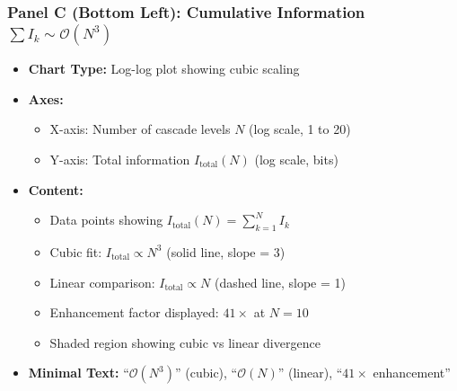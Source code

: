 \subsubsection*{Panel C (Bottom Left): Cumulative Information $\sum I_k \sim \mathcal{O}(N^3)$}
\begin{itemize}
\item \textbf{Chart Type:} Log-log plot showing cubic scaling
\item \textbf{Axes:}
  \begin{itemize}
  \item X-axis: Number of cascade levels $N$ (log scale, 1 to 20)
  \item Y-axis: Total information $I_{\text{total}}(N)$ (log scale, bits)
  \end{itemize}
\item \textbf{Content:}
  \begin{itemize}
  \item Data points showing $I_{\text{total}}(N) = \sum_{k=1}^{N} I_k$
  \item Cubic fit: $I_{\text{total}} \propto N^3$ (solid line, slope = 3)
  \item Linear comparison: $I_{\text{total}} \propto N$ (dashed line, slope = 1)
  \item Enhancement factor displayed: $41\times$ at $N=10$
  \item Shaded region showing cubic vs linear divergence
  \end{itemize}
\item \textbf{Minimal Text:} ``$\mathcal{O}(N^3)$'' (cubic), ``$\mathcal{O}(N)$'' (linear), ``$41\times$ enhancement''
\end{itemize}

